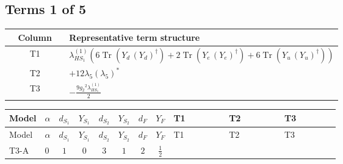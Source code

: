 \documentclass[8pt]{article}
\begin{document}
\begin{landscape}
\subsection*{Terms 1 of 5}
\begin{center}
\begin{tabular}{@{}c >{\raggedright\arraybackslash}p{0.82\linewidth}@{}}
\toprule
Column & Representative term structure \\
\midrule
T1 & \(\displaystyle {\lambda_{HS_1}^{(1)}} (6 \operatorname{Tr}\!\left({Y_d}\,\left({Y_d}\right)^{\dagger}\right)+2 \operatorname{Tr}\!\left({Y_e}\,\left({Y_e}\right)^{\dagger}\right)+6 \operatorname{Tr}\!\left({Y_u}\,\left({Y_u}\right)^{\dagger}\right))\) \\
\midrule
T2 & \(\displaystyle +12 {\lambda_5} \left({\lambda_5}\right)^{*}\) \\
\midrule
T3 & \(\displaystyle -\frac{9 {g_2}^2 {\lambda_{HS_1}^{(1)}}}{2}\) \\
\midrule
\bottomrule
\end{tabular}
\end{center}
\smallskip
\tiny
\begin{longtable}{@{}llcccccc >{\raggedright\arraybackslash}p{0.21\linewidth} >{\raggedright\arraybackslash}p{0.21\linewidth} >{\raggedright\arraybackslash}p{0.21\linewidth}@{}}
\toprule
Model & $\alpha$ & $d_{S_1}$ & $Y_{S_1}$ & $d_{S_2}$ & $Y_{S_2}$ & $d_F$ & $Y_F$ & T1 & T2 & T3 \\
\midrule
\endfirsthead
\toprule
Model & $\alpha$ & $d_{S_1}$ & $Y_{S_1}$ & $d_{S_2}$ & $Y_{S_2}$ & $d_F$ & $Y_F$ & T1 & T2 & T3 \\
\midrule
\endhead
T3-A & $0$ & $1$ & $0$ & $3$ & $1$ & $2$ & $\frac{1}{2}$ & \scriptsize\adjustbox{max width=\linewidth}{$\begin{gathered} {\lambda_{HS_1}^{(1)}} (6 \operatorname{Tr}\!\left({Y_d}\,\left({Y_d}\right)^{\dagger}\right)+2 \operatorname{Tr}\!\left({Y_e}\,\left({Y_e}\right)^{\dagger}\right)+6 \operatorname{Tr}\!\left({Y_u}\,\left({Y_u}\right)^{\dagger}\right))\end{gathered}$} & \scriptsize\adjustbox{max width=\linewidth}{$\begin{gathered} +12 {\lambda_5} \left({\lambda_5}\right)^{*}\end{gathered}$} & \scriptsize\adjustbox{max width=\linewidth}{$\begin{gathered} -\frac{9 {g_2}^2 {\lambda_{HS_1}^{(1)}}}{2}\end{gathered}$} \\
\midrule

\end{longtable}
\end{landscape}
\end{document}
